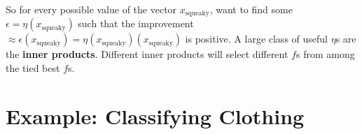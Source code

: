 \documentclass[openany, notitlepage, justified]{tufte-book}
\begin{document}
            So for every possible value of the vector $x_{\text{squeaky}}$,
            want to find some $\epsilon = \eta(x_{\text{squeaky}})$ such that
            the improvement $\approx \epsilon(x_{\text{squeaky}}) =
            \eta(x_{\text{squeaky}})(x_{\text{squeaky}})$ is positive.
            A large
            class of useful $\eta$s are the \textbf{inner products}.
            Different inner products will select different $f$s from among the
            tied best $f$s.




    \newpage
    \chapter{Example: Classifying Clothing}
\end{document}
